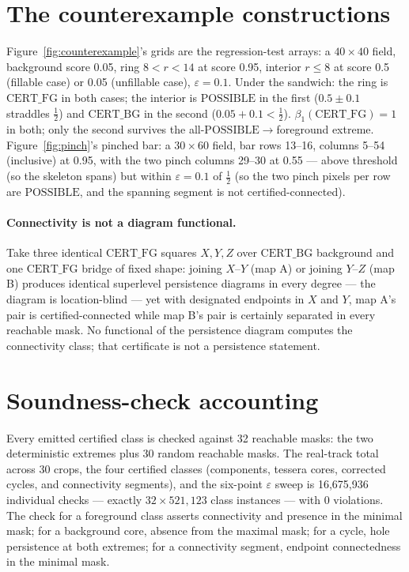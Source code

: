 \documentclass[10pt]{article}
\newcommand{\CFG}{\mathrm{CERT\_FG}}
\newcommand{\CBG}{\mathrm{CERT\_BG}}
\newcommand{\POSS}{\mathrm{POSSIBLE}}
\newcommand{\eps}{\varepsilon}
\begin{document}
\section{The counterexample constructions}\label{app:constructions}
Figure~\ref{fig:counterexample}'s grids are the regression-test arrays: a
$40\times 40$ field, background score 0.05, ring $8<r<14$ at score 0.95,
interior $r\le 8$ at score 0.5 (fillable case) or 0.05 (unfillable case),
$\eps=0.1$. Under the sandwich: the ring is $\CFG$ in both cases; the
interior is $\POSS$ in the first ($0.5\pm 0.1$ straddles $\tfrac12$) and
$\CBG$ in the second ($0.05+0.1<\tfrac12$). $\beta_1(\CFG)=1$ in both;
only the second survives the all-$\POSS\to$foreground extreme.
Figure~\ref{fig:pinch}'s pinched bar: a $30\times 60$ field, bar rows
13--16, columns 5--54 (inclusive) at 0.95, with the two pinch columns
29--30 at 0.55 --- above threshold (so the skeleton spans) but within
$\eps=0.1$ of $\tfrac12$ (so the two pinch pixels per row are $\POSS$,
and the spanning segment is not certified-connected).

\paragraph{Connectivity is not a diagram functional.} Take three
identical $\CFG$ squares $X, Y, Z$ over $\CBG$ background and one $\CFG$
bridge of fixed shape: joining $X$--$Y$ (map A) or joining $Y$--$Z$ (map
B) produces identical superlevel persistence diagrams in every degree ---
the diagram is location-blind --- yet with designated endpoints in $X$
and $Y$, map A's pair is certified-connected while map B's pair is
certainly separated in every reachable mask. No functional of the
persistence diagram computes the connectivity class; that certificate is
not a persistence statement.

\section{Soundness-check accounting}\label{app:accounting}
Every emitted certified class is checked against 32 reachable masks: the
two deterministic extremes plus 30 random reachable masks. The real-track
total across 30 crops, the four certified classes (components, tessera
cores, corrected cycles, and connectivity segments), and the six-point $\eps$ sweep is
16{,}675{,}936 individual checks --- exactly $32 \times 521{,}123$ class
instances --- with 0 violations. The check for a foreground class asserts
connectivity and presence in the minimal mask; for a background core,
absence from the maximal mask; for a cycle, hole persistence at both
extremes; for a connectivity segment, endpoint connectedness in the
minimal mask.
\end{document}
